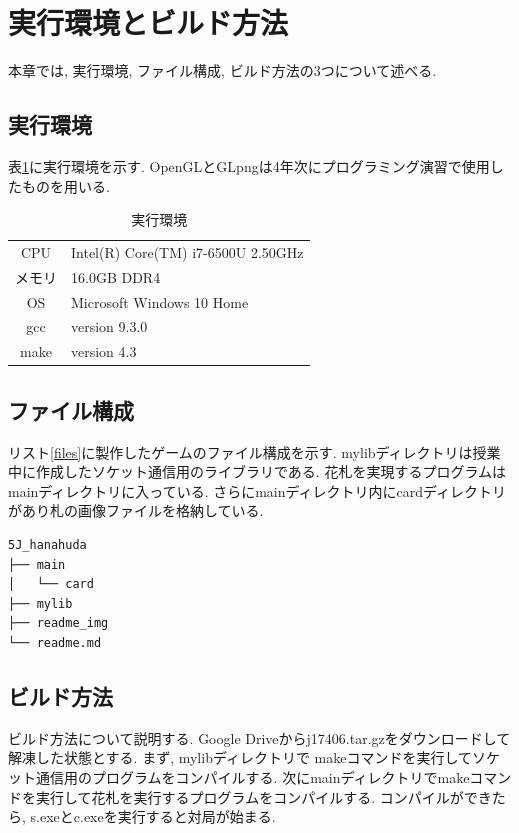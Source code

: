 \documentclass[a4j]{jarticle}
\begin{document}
    \section{実行環境とビルド方法}
    本章では, 実行環境, ファイル構成, ビルド方法の3つについて述べる.
    \subsection{実行環境}
    表\ref{env}に実行環境を示す. OpenGLとGLpngは4年次にプログラミング演習で使用したものを用いる.  
    \begin{table}[H]
        \caption{実行環境}
      \label{env}
      \begin{center}
          \begin{tabular}{c|l}\hline
            CPU & Intel(R) Core(TM) i7-6500U 2.50GHz  \\ 
            メモリ & 16.0GB DDR4 \\
            OS & Microsoft Windows 10 Home \\
            gcc &  version 9.3.0 \\
            make & version 4.3 \\ \hline
          \end{tabular}
      \end{center}
      \end{table}

    \subsection{ファイル構成}
    リスト\ref{files}に製作したゲームのファイル構成を示す. mylibディレクトリは授業中に作成したソケット通信用のライブラリである. 花札を実現するプログラムは
    mainディレクトリに入っている. さらにmainディレクトリ内にcardディレクトリがあり札の画像ファイルを格納している.
    \begin{lstlisting}[basicstyle=\ttfamily\footnotesize, frame=single,label=files,caption=ファイル構成]
5J_hanahuda
├── main
│   └── card
├── mylib
├── readme_img
└── readme.md
    \end{lstlisting}

    \subsection{ビルド方法}
ビルド方法について説明する. Google Driveからj17406.tar.gzをダウンロードして解凍した状態とする. まず, mylibディレクトリで
makeコマンドを実行してソケット通信用のプログラムをコンパイルする. 次にmainディレクトリでmakeコマンドを実行して花札を実行するプログラムをコンパイルする.
コンパイルができたら, s.exeとc.exeを実行すると対局が始まる.
\end{document}
